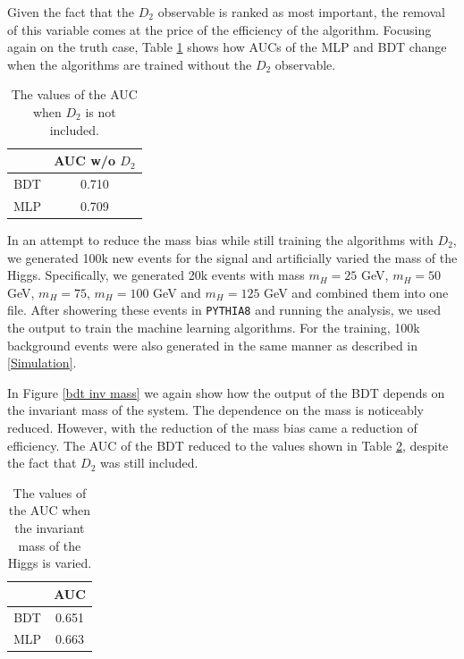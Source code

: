 \documentclass[10pt,a4paper]{book}
\def\code#1{\texttt{#1}}
\begin{document}
Given the fact that the $D_2$ observable is ranked as most important, the removal of this variable comes at the price of the efficiency of the algorithm. Focusing again on the truth case, Table \ref{AUC table} shows how AUCs of the MLP and BDT change when the algorithms are trained without the $D_2$ observable.

\begin{table}[h!]
\centering
\begin{tabular}{|c|c|}
\hline 
\* & AUC w/o $D_2$ \\ 
\hline 
BDT &  0.710\\ 
\hline 
MLP &  0.709\\ 
\hline 
\end{tabular}
\caption{The values of the AUC when $D_2$ is not included.}
\label{AUC table}
\end{table}

In an attempt to reduce the mass bias while still training the algorithms with $D_2$, we generated 100k new events for the signal and artificially varied the mass of the Higgs. Specifically, we generated 20k events with mass $m_H = 25$ GeV, $m_H = 50$ GeV, $m_H = 75$, $m_H = 100$ GeV and $m_H = 125$ GeV and combined them into one file. After showering these events in \code{PYTHIA8} and running the analysis, we used the output to train the machine learning algorithms. For the training, 100k background events were also generated in the same manner as described in \ref{Simulation}.

In Figure \ref{bdt inv mass} we again show how the output of the BDT depends on the invariant mass of the system. The dependence on the mass is noticeably reduced. However, with the reduction of the mass bias came a reduction of efficiency. The AUC of the BDT reduced to the values shown in Table \ref{AUC table mass bias}, despite the fact that $D_2$ was still included.

\begin{table}[h!]
\centering
\begin{tabular}{|c|c|}
\hline 
\* & AUC \\ 
\hline 
BDT & 0.651 \\ 
\hline 
MLP &  0.663\\ 
\hline 
\end{tabular}
\caption{The values of the AUC when the invariant mass of the Higgs is varied.}
\label{AUC table mass bias}
\end{table}
\end{document}
